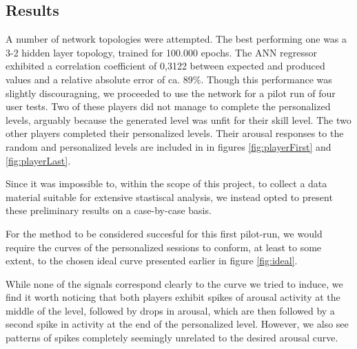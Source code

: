 \documentclass{llncs}
\begin{document}
\subsection{Results}
A number of network topologies were attempted. The best performing one was a 3-2 hidden layer topology, trained for 100.000 epochs. The ANN regressor exhibited a correlation coefficient of 0,3122 between expected and produced values and a relative absolute error of ca. 89\%. Though this performance was slightly discouragning, we proceeded to use the network for a pilot run of four user tests.
Two of these players did not manage to complete the personalized levels, arguably because the generated level was unfit for their skill level.
The two other players completed their personalized levels. Their arousal responses to the random and personalized levels are included in in figures \ref{fig:playerFirst} and \ref{fig:playerLast}.

Since it was impossible to, within the scope of this project, to collect a data material suitable for extensive stastiscal analysis, we instead opted to present these preliminary results on a case-by-case basis.

For the method to be considered succesful for this first pilot-run, we would require the curves of the personalized sessions to conform, at least to some extent, to the chosen ideal curve presented earlier in figure \ref{fig:ideal}.

While none of the signals correspond clearly to the curve we tried to induce, we find it worth noticing that both players exhibit spikes of arousal activity at the middle of the level, followed by drops in arousal, which are then followed by a second spike in activity at the end of the personalized level. However, we also see patterns of spikes completely seemingly unrelated to the desired arousal curve.
\end{document}
